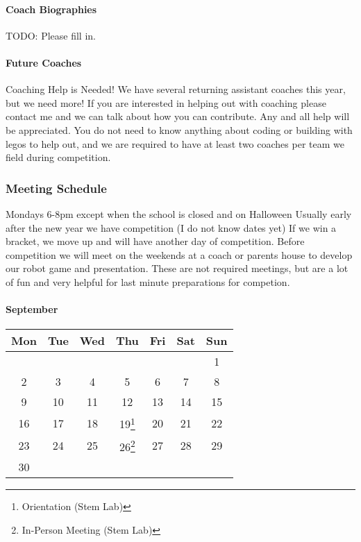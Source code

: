 \hypertarget{coach-biographies}{%
\paragraph{Coach Biographies}\label{coach-biographies}}

TODO: Please fill in.

\hypertarget{future-coaches}{%
\paragraph{Future Coaches}\label{future-coaches}}

Coaching Help is Needed! We have several returning assistant coaches
this year, but we need more! If you are interested in helping out with
coaching please contact me and we can talk about how you can contribute.
Any and all help will be appreciated. You do not need to know anything
about coding or building with legos to help out, and we are required to
have at least two coaches per team we field during competition.

\hypertarget{meeting-schedule}{%
\subsubsection{Meeting Schedule}\label{meeting-schedule}}

Mondays 6-8pm except when the school is closed and on Halloween Usually
early after the new year we have competition (I do not know dates yet)
If we win a bracket, we move up and will have another day of
competition. Before competition we will meet on the weekends at a coach
or parents house to develop our robot game and presentation. These are
not required meetings, but are a lot of fun and very helpful for last
minute preparations for competion.

\hypertarget{september}{%
\paragraph{September}\label{september}}

\begin{longtable}[]{@{}ccccccc@{}}
\toprule\noalign{}
Mon & Tue & Wed & Thu & Fri & Sat & Sun \\
\midrule\noalign{}
\endhead
\bottomrule\noalign{}
\endlastfoot
& & & & & & 1 \\
2 & 3 & 4 & 5 & 6 & 7 & 8 \\
9 & 10 & 11 & 12 & 13 & 14 & 15 \\
16 & 17 & 18 & 19\footnote{Orientation (Stem Lab)} & 20 & 21 & 22 \\
23 & 24 & 25 & 26\footnote{In-Person Meeting (Stem Lab)} & 27 & 28 &
29 \\
30 & & & & & & \\
\end{longtable}

